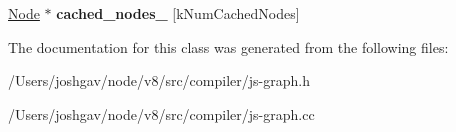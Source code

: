 \begin{DoxyCompactItemize}
\item 
\hyperlink{classv8_1_1internal_1_1compiler_1_1_node}{Node} $\ast$ {\bfseries cached\+\_\+nodes\+\_\+} \mbox{[}k\+Num\+Cached\+Nodes\mbox{]}\hypertarget{classv8_1_1internal_1_1compiler_1_1_j_s_graph_abf589aba2b3bf98ee58f8c282c755e9f}{}\label{classv8_1_1internal_1_1compiler_1_1_j_s_graph_abf589aba2b3bf98ee58f8c282c755e9f}

\end{DoxyCompactItemize}


The documentation for this class was generated from the following files\+:\begin{DoxyCompactItemize}
\item 
/\+Users/joshgav/node/v8/src/compiler/js-\/graph.\+h\item 
/\+Users/joshgav/node/v8/src/compiler/js-\/graph.\+cc\end{DoxyCompactItemize}
